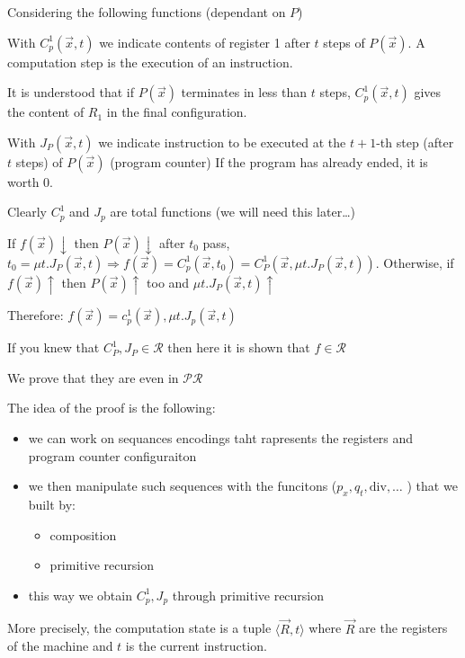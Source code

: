 Considering the following functions (dependant on $P$)

With $ C_p^1(\vec{x}, t) $ we indicate contents of register 1 after $t$ steps of $ P(\vec{x}) $. A computation step is the execution of an instruction.

It is understood that if $P(\vec{x})$ terminates in less than $t$ steps, $ C_p^1(\vec{x}, t) $ gives the content of $R_1$ in the final configuration.

With $ J_P(\vec{x},t) $ we indicate instruction to be executed at the $t+1$-th step (after $t$ steps) of $P(\vec{x})$ (program counter) If the program has already ended, it is worth 0.

Clearly $C_p^1$ and $J_p$ are total functions (we will need this later\dots)

If $ f(\vec{x})\downarrow $ then $ P(\vec{x})\downarrow $ after $ t_0 $ pass, $ t_0 = \mu t. J_P(\vec{x},t) \Rightarrow f(\vec{x}) = C_p^1(\vec{x},t_0) = C_P^1(\vec{x}, \mu t.J_P(\vec{x},t)) $.
Otherwise, if $ f(\vec{x})\uparrow $ then $P(\vec{x})\uparrow$ too and $ \mu t.J_P(\vec{x},t)\uparrow $

Therefore:
$f(\vec{x}) = c_p^1(\vec{x}),\mu t.J_p(\vec{x},t)$


If you knew that $ C_P^1, J_P \in \mathcal{R} $ then here it is shown that $ f \in \mathcal{R} $

We prove that they are even in $ \mathcal{PR} $

The idea of the proof is the following:

\begin{itemize}
\item we can work on sequances encodings taht rapresents the registers and program counter configuraiton
\item we then manipulate such sequences  with the funcitons (\( p_x, q_t, \text{div}, \dots \) ) that we built by:
\begin{itemize}
\item composition
\item primitive recursion
\end{itemize}
\item this way we obtain $C_p^1, J_p$ through primitive recursion
\end{itemize}
More precisely, the computation state is a tuple $\langle \vec{R}, t \rangle$ where $\vec{R}$ are the registers of the machine and $t$ is the current instruction.

